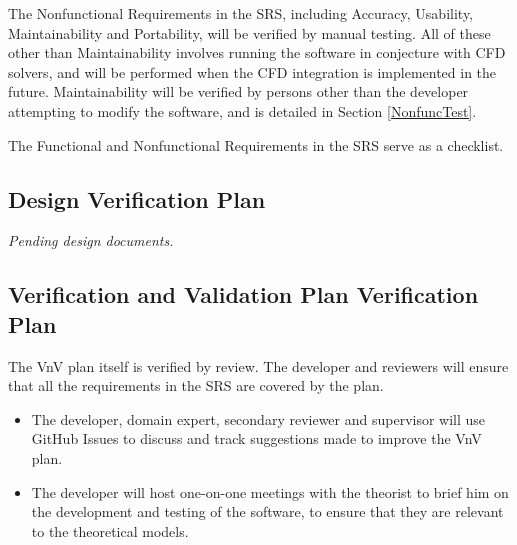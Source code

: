 \documentclass[12pt, titlepage]{article}
\begin{document}
The Nonfunctional Requirements in the SRS, including Accuracy, Usability, Maintainability and Portability, will be verified by manual testing. All of these other than Maintainability involves running the software in conjecture with CFD solvers, and will be performed when the CFD integration is implemented in the future. Maintainability will be verified by persons other than the developer attempting to modify the software, and is detailed in Section \ref{NonfuncTest}.

The Functional and Nonfunctional Requirements in the SRS serve as a checklist.



\subsection{Design Verification Plan}

\textit{Pending design documents.}




\subsection{Verification and Validation Plan Verification Plan}

The VnV plan itself is verified by review. The developer and reviewers will ensure that all the requirements in the SRS are covered by the plan. 
\begin{itemize}
  \item The developer, domain expert, secondary reviewer and supervisor will use GitHub Issues to discuss and track suggestions made to improve the VnV plan.
  \item The developer will host one-on-one meetings with the theorist to brief him on the development and testing of the software, to ensure that they are relevant to the theoretical models.
\end{itemize}
 

\end{document}
